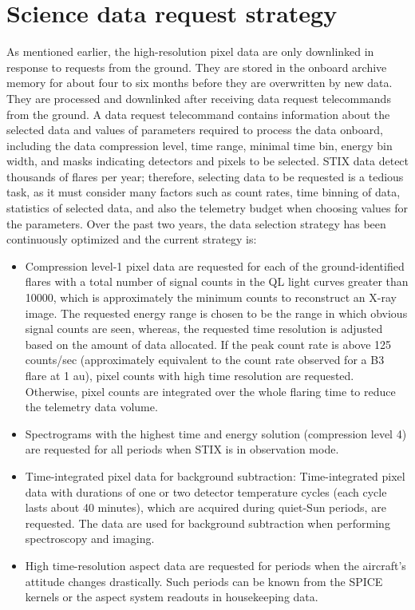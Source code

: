 \documentclass[referee]{aa} %
\begin{document}
\section{Science data request strategy}
As mentioned earlier, the high-resolution pixel data are only downlinked in response to requests from the
ground. They are stored in the onboard archive memory for about four to six months 
before they are overwritten by new data. They are processed and downlinked 
after receiving data request telecommands from the ground. 
A data request telecommand contains information about the selected data and values of parameters  required to process the data onboard, including the data compression level, 
time range, minimal time bin, energy bin width, 
and  masks indicating detectors and pixels to be selected. 
STIX data detect thousands of flares per year; therefore, 
selecting data to be requested is a tedious task, as it must consider many factors
such as count rates, time binning of data, statistics of selected data, 
and also the telemetry budget when choosing values for the parameters. 
Over the past two years, the data selection strategy has been continuously optimized and the current strategy is: 
\begin{itemize}
  \item  
 Compression level-1 pixel data are requested for each of the ground-identified  flares with a total number of signal counts in the QL light curves greater than 10000, which is approximately the minimum counts to reconstruct an X-ray image. 
The requested energy range is chosen to be the range in which obvious signal counts are seen,  
whereas, the requested time resolution is adjusted based on the amount of data allocated. 
If the peak count rate is above 125 counts/sec (approximately 
equivalent to the count rate observed for a B3 flare at 1 au),  pixel counts with high time resolution are requested.  Otherwise, pixel counts are integrated over the whole flaring time 
to reduce the telemetry data volume. 
 \item  Spectrograms with the highest time and energy solution (compression level 4) are requested for all periods when STIX is in observation mode. 
 \item Time-integrated pixel data for background subtraction:
Time-integrated pixel data with durations of one or two detector temperature cycles (each cycle lasts about 40 minutes), which are acquired during quiet-Sun periods, are requested. 
The data are used for background subtraction when performing spectroscopy and imaging. 
\item High time-resolution aspect data are requested for periods when the aircraft's attitude changes drastically.
Such periods can be known from the SPICE kernels or the aspect system readouts in housekeeping data. 
\end{itemize}
\end{document}
